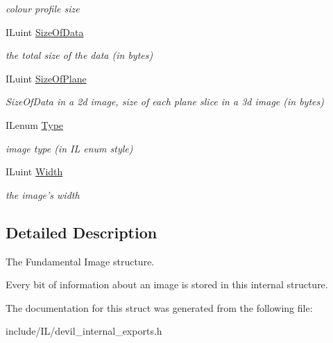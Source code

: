 \begin{DoxyCompactItemize}
\begin{DoxyCompactList}\small\item\em colour profile size \end{DoxyCompactList}\item 
\hypertarget{struct_i_limage_ad3bfe4c8a6696b42835730f7b70327b7}{I\-Luint \hyperlink{struct_i_limage_ad3bfe4c8a6696b42835730f7b70327b7}{Size\-Of\-Data}}\label{struct_i_limage_ad3bfe4c8a6696b42835730f7b70327b7}

\begin{DoxyCompactList}\small\item\em the total size of the data (in bytes) \end{DoxyCompactList}\item 
\hypertarget{struct_i_limage_ae48f15f42689820f0eb4fadffd6174bb}{I\-Luint \hyperlink{struct_i_limage_ae48f15f42689820f0eb4fadffd6174bb}{Size\-Of\-Plane}}\label{struct_i_limage_ae48f15f42689820f0eb4fadffd6174bb}

\begin{DoxyCompactList}\small\item\em Size\-Of\-Data in a 2d image, size of each plane slice in a 3d image (in bytes) \end{DoxyCompactList}\item 
\hypertarget{struct_i_limage_a437e4fc3b579e2e7879dedd0fd2ac587}{I\-Lenum \hyperlink{struct_i_limage_a437e4fc3b579e2e7879dedd0fd2ac587}{Type}}\label{struct_i_limage_a437e4fc3b579e2e7879dedd0fd2ac587}

\begin{DoxyCompactList}\small\item\em image type (in I\-L enum style) \end{DoxyCompactList}\item 
\hypertarget{struct_i_limage_a4146e7b2b0b4097e0e335f9b348392bf}{I\-Luint \hyperlink{struct_i_limage_a4146e7b2b0b4097e0e335f9b348392bf}{Width}}\label{struct_i_limage_a4146e7b2b0b4097e0e335f9b348392bf}

\begin{DoxyCompactList}\small\item\em the image's width \end{DoxyCompactList}\end{DoxyCompactItemize}


\subsection{Detailed Description}
The Fundamental Image structure. 

Every bit of information about an image is stored in this internal structure. 

The documentation for this struct was generated from the following file\-:\begin{DoxyCompactItemize}
\item 
include/\-I\-L/devil\-\_\-internal\-\_\-exports.\-h\end{DoxyCompactItemize}
